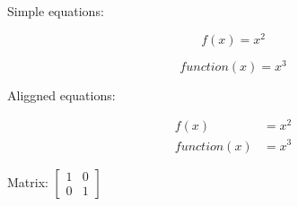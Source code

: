 \documentclass{article}
\begin{document}
\thispagestyle{empty}

Simple equations:

    \begin{equation*} %
    f(x) = x^2
    \end{equation*}

    \begin{equation*}
    function(x) = x^3
    \end{equation*}

Aliggned equations:

    \begin{align*}
    f(x) &= x^2\\
    function(x) &= x^3
    \end{align*}

Matrix:
    $
    \left[
    \begin{matrix}
    1 & 0\\
    0 & 1
    \end{matrix}
    \right]
    $
\end{document}
